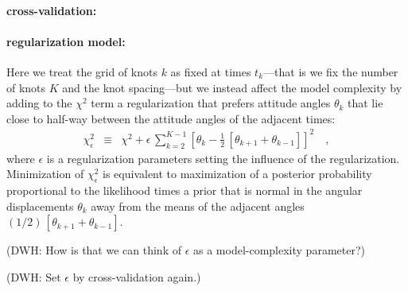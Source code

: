 \documentclass[12pt]{article}
\begin{document}
\paragraph{cross-validation:}

\paragraph{regularization model:}
Here we treat the grid of knots $k$ as fixed at times $t_k$---that is
we fix the number of knots $K$ and the knot spacing---but we instead
affect the model complexity by adding to the $\chi^2$ term a
regularization that prefers attitude angles $\theta_k$ that lie close
to half-way between the attitude angles of the adjacent times:
\begin{eqnarray}\displaystyle
\chi^2_\epsilon &\equiv& \chi^2 + \epsilon\,\sum_{k=2}^{K-1} \left[\theta_k - \frac{1}{2}\,[\theta_{k+1} + \theta_{k-1}]\right]^2
\quad ,
\end{eqnarray}
where $\epsilon$ is a regularization parameters setting the influence
of the regularization.  Minimization of $\chi^2_\epsilon$ is
equivalent to maximization of a posterior probability proportional to
the likelihood times a prior that is normal in the angular
displacements $\theta_k$ away from the means of the adjacent angles
$(1/2)\,[\theta_{k+1}+\theta_{k-1}]$.

(DWH: How is that we can think of $\epsilon$ as a model-complexity
parameter?)

(DWH: Set $\epsilon$ by cross-validation again.)
\end{document}

